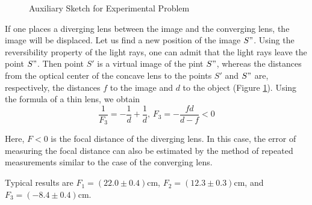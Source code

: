 \documentclass[12pt,a4paper]{book}
\begin{document}
	\begin{figure}
		[!hbtp]
		\centering
		\caption{Auxiliary Sketch for Experimental Problem}
		\label{sketch_4_5_2}
	\end{figure}\par
	If one places a diverging lens between the image and the converging lens, the image will be displaced. Let us f\mbox{}ind a new position of the image $S"$. Using the reversibility property of the light rays, one can admit that the light rays leave the point $S"$. Then point $S'$ is a virtual image of the pint $S"$, whereas the distances from the optical center of the concave lens to the points $S'$ and $S"$ are, respectively, the distances $f$ to the image and $d$ to the object (Figure \ref{sketch_4_5_2}). Using the formula of a thin lens, we obtain
	\begin{equation*}
		\frac{1}{F_3}=-\frac{1}{d}+\frac{1}{d}\text{, }F_3=-\frac{fd}{d-f}<0
	\end{equation*}\par
	Here, $F<0$ is the focal distance of the diverging lens. In this case, the error of measuring the focal distance can also be estimated by the method of repeated measurements similar to the case of the converging lens.\par
	Typical results are $F_1=(22.0\pm0.4)\text{cm}$, $F_2=(12.3\pm0.3)\text{cm}$, and $F_3=(-8.4\pm0.4)\text{cm}$.
\end{document}
